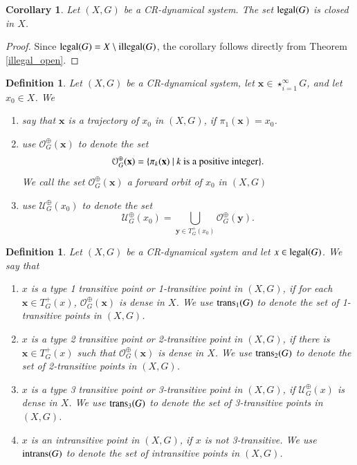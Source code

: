 \documentclass[a4paper,12pt]{article} %
\newcommand{\orbit}{\mathcal{O}^{\oplus}}
\newcommand{\illegal}{\textup{illegal}}
\newcommand{\legal}{\textup{legal}}
\newcommand{\trans}{\textup{trans}}
\newcommand{\intrans}{\textup{intrans}}
\newtheorem{definition}[theorem]{Definition}
\newtheorem{corollary}[theorem]{Corollary}
\begin{document}
\begin{corollary}\label{cor}
Let $(X,G)$ be a CR-dynamical system.  The set $\legal(G)$ is closed in $X$.
\end{corollary}
\begin{proof}
Since $\legal(G)=X\setminus \illegal(G)$,  the corollary follows  directly from Theorem \ref{illegal_open}. 
\end{proof}
\begin{definition}
Let $(X,G)$ be a CR-dynamical system, let $\mathbf x\in \star_{i=1}^{\infty}G$, and let $x_0\in X$. We 
 \begin{enumerate}
 \item say that $\mathbf x$ is \emph{\color{blue} a trajectory of $x_0$ in $(X,G)$}, if $\pi_1(\mathbf x)=x_0$. 
 \item use \emph{ \color{blue}  $\mathcal O_G^{\oplus}(\mathbf x)$} to denote the set
 $$
 \mathcal O_G^{\oplus}(\mathbf x)=\{\pi_k(\mathbf x) \ | \  k \textup{ is a positive integer}\}.
 $$
 We call the set $\mathcal O_G^{\oplus}(\mathbf x)$ \emph{\color{blue} a forward orbit of $x_0$ in $(X,G)$}
 \item use \emph{ \color{blue}  $\mathcal U_G^{\oplus}(x_0)$} to denote the set
 $$
 \mathcal U_G^{\oplus}(x_0)=\bigcup_{\mathbf y\in T_G^{+}(x_0)}\mathcal O_G^{\oplus}(\mathbf y).
 $$
 \end{enumerate}
\end{definition}
\begin{definition}
Let $(X,G)$ be a CR-dynamical system and let $x\in \legal(G)$.  We say that 
\begin{enumerate}
\item $x$ is \emph{\color{blue} a type 1 transitive point} or \emph{\color{blue} 1-transitive point} in $(X,G)$, if for each $\mathbf x\in T_G^{+}(x)$, $\orbit_G(\mathbf x)$ is dense in $X$. We use \emph{\color{blue} $\trans_1(G)$ } to denote the set of 1-transitive points in $(X,G)$.
\item $x$ is \emph{\color{blue} a type 2 transitive point} or \emph{\color{blue} 2-transitive point} in $(X,G)$, if there is $\mathbf x\in T_G^{+}(x)$ such that $\orbit_G(\mathbf x)$ is dense in $X$. We use \emph{\color{blue} $\trans_2(G)$ } to denote the set of 2-transitive points in $(X,G)$.
\item $x$ is \emph{\color{blue} a type 3 transitive point} or \emph{\color{blue} 3-transitive point} in $(X,G)$, if $\mathcal U_G^{\oplus}(x)$ is dense in $X$. We use \emph{\color{blue} $\trans_3(G)$ } to denote the set of 3-transitive points in $(X,G)$.
\item $x$ is \emph{\color{blue} an intransitive point} in $(X,G)$, if $x$ is not 3-transitive. We use \emph{\color{blue} $\intrans(G)$ } to denote the set of intransitive points in $(X,G)$.
\end{enumerate}
\end{definition}
\end{document}
